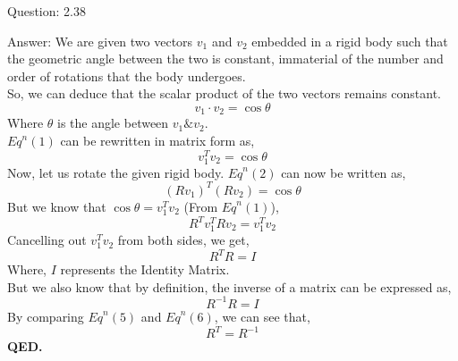 \documentclass[a4paper]{article}
\begin{document}
\begin{qalist}
			
		\item[Question: 2.38] \setcounter{equation}{0}
		\item[Answer:]						
			We are given two vectors ${v}_{1}$ and ${v}_{2}$ embedded in a rigid body such that the geometric angle between the two is constant, immaterial of the number and order of rotations that the body undergoes. \\
			So, we can deduce that the scalar product of the two vectors remains constant.
			\begin{equation}{v}_{1} \cdot {v}_{2} = \cos\theta\end{equation}  Where $\theta$ is the angle between ${v}_{1} \& {v}_{2}$.\\
			${Eq}^{n} (1)$ can be rewritten in matrix form as,
			\begin{equation}{v}^{T}_{1}{v}_{2} = \cos\theta\end{equation} 
			Now, let us rotate the given rigid body. ${Eq}^{n} (2)$ can now be written as,
			\begin{equation}{(R{v}_{1})}^{T}({Rv}_{2}) = \cos\theta\end{equation} 
			But we know that $\cos\theta = {v}^{T}_{1}{v}_{2}$ (From ${Eq}^{n} (1)$),
			\begin{equation}{R}^{T}{v}^{T}_{1}R{v}_{2} = {v}^{T}_{1}{v}_{2}\end{equation} 
			Cancelling out ${v}^{T}_{1}{v}_{2}$ from both sides, we get,
			\begin{equation}{R}^{T}R = I\end{equation} 
			Where, $I$ represents the Identity Matrix. \\But we also know that by definition, the inverse of a matrix can be expressed as, 
			\begin{equation}{R}^{-1}R = I\end{equation}
			By comparing ${Eq}^{n} (5)$ and ${Eq}^{n} (6)$, we can see that,
			\begin{equation}{R}^{T} = {R}^{-1}\end{equation} 
			\textbf{QED.}
	\end{qalist}
\end{document}
